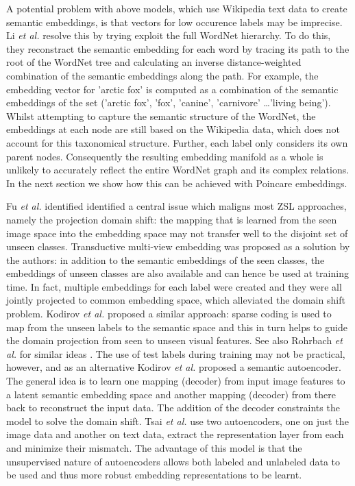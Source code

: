 \documentclass[12pt]{report}
\begin{document}
A potential problem with above models, which use Wikipedia text data to create semantic embeddings, is that vectors for low occurence labels may be imprecise. Li \textit{et al.} \cite{} resolve this by trying exploit the full WordNet hierarchy. To do this, they reconstract the semantic embedding for each word by tracing its path to the root of the WordNet tree and calculating an inverse distance-weighted combination of the semantic embeddings along the path. For example, the embedding vector for 'arctic fox' is computed as a combination of the semantic embeddings of the set ('arctic fox', 'fox', 'canine', 'carnivore' \dots 'living being'). Whilst attempting to capture the semantic structure of the WordNet, the embeddings at each node are still based on the Wikipedia data, which does not account for this taxonomical structure. Further, each label only considers its own parent nodes. Consequently the resulting embedding manifold as a whole is unlikely to accurately reflect the entire WordNet graph and its complex relations. In the next section we show how this can be achieved with Poincare embeddings.

Fu \textit{et al.} \cite{Fu2015} identified identified a central issue which maligns most ZSL approaches, namely the projection domain shift: the mapping that is learned from the seen image space into the embedding space may not transfer well to the disjoint set of unseen classes. Transductive multi-view embedding was proposed as a solution by the authors: in addition to the semantic embeddings of the seen classes, the embeddings of unseen classes are also available and can hence be used at training time. In fact, multiple embeddings for each label were created and they were all jointly projected to common embedding space, which alleviated the domain shift problem. Kodirov \textit{et al.} \cite{Kodirov2015} proposed a similar approach: sparse coding is used to map from the unseen labels to the semantic space and this in turn helps to guide the domain projection from seen to unseen visual features. See also Rohrbach \textit{et al.} for similar ideas \cite{Rohrbach2013}. The use of test labels during training may not be practical, however, and as an alternative Kodirov \textit{et al.} \cite{Kodirov2017} proposed a semantic autoencoder. The general idea is to learn one mapping (decoder) from input image features to a latent semantic embedding space and another mapping (decoder) from there back to reconstruct the input data. The addition of the decoder constraints the model to solve the domain shift. Tsai \textit{et al.} \cite{Tsai2016} use two autoencoders, one on just the image data and another on text data, extract the representation layer from each and minimize their mismatch. The advantage of this model is that the unsupervised nature of autoencoders allows both labeled and unlabeled data to be used and thus more robust embedding representations to be learnt.
\end{document}
